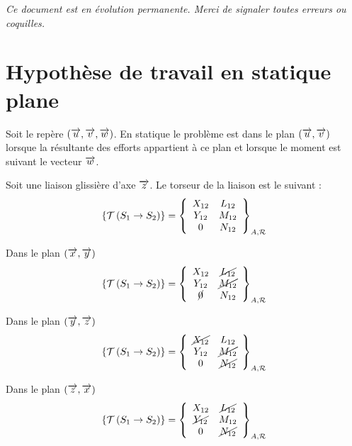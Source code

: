 \documentclass[11pt,oneside]{article}
\begin{document}
\setlength{\parskip}{0ex plus 0.2ex minus 0ex}
 \renewcommand{\contentsname}{}
 \renewcommand{\baselinestretch}{1}

\tableofcontents

 \renewcommand{\baselinestretch}{1.2}
\setlength{\parskip}{2ex plus 0.5ex minus 0.2ex}

\textit{Ce document est en évolution permanente. Merci de signaler toutes
erreurs ou coquilles.}

\section{Hypothèse de travail en statique plane}
\begin{defi}
Soit le repère $(\vect{u},\vect{v},\vect{w})$. En statique le problème est dans le plan $(\vect{u},\vect{v})$ lorsque la résultante des efforts appartient à ce plan et lorsque le moment est suivant le vecteur $\vect{w}$.
\end{defi}

\begin{exemple}
Soit une liaison glissière d'axe $\vect{z}$. Le torseur de la liaison est le suivant :
$$
\torseurstat{T}{S_1}{S_2}=
\torseurcol{X_{12}}{Y_{12}}{0}{L_{12}}{M_{12}}{N_{12}}{A,\mathcal{R}}
$$

\begin{minipage}[c]{.3\linewidth}
\begin{center}
Dans le plan $(\vect{x},\vect{y})$
$$
\torseurstat{T}{S_1}{S_2}=
\torseurcol{X_{12}}{Y_{12}}{\cancel{0}}{\cancel{L_{12}}}{\cancel{M_{12}}}{N_{12}}{A,\mathcal{R}}
$$
\end{center}
\end{minipage}\hfill
\begin{minipage}[c]{.3\linewidth}
\begin{center}
Dans le plan $(\vect{y},\vect{z})$
$$
\torseurstat{T}{S_1}{S_2}=
\torseurcol{\cancel{X_{12}}}{Y_{12}}{0}{L_{12}}{\cancel{M_{12}}}{\cancel{N_{12}}}{A,\mathcal{R}}
$$
\end{center}
\end{minipage}\hfill
\begin{minipage}[c]{.3\linewidth}
\begin{center}
Dans le plan $(\vect{z},\vect{x})$
$$
\torseurstat{T}{S_1}{S_2}=
\torseurcol{X_{12}}{\cancel{Y_{12}}}{0}{\cancel{L_{12}}}{M_{12}}{\cancel{N_{12}}}{A,\mathcal{R}}
$$
\end{center}
\end{minipage}

\end{exemple}
\end{document}
